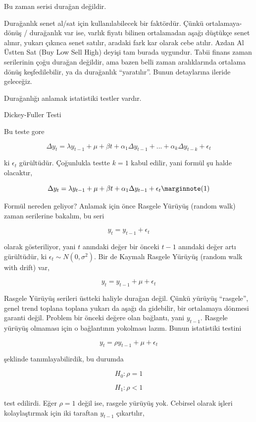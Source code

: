 \documentclass[12pt,fleqn]{article}\usepackage{../../common}
\begin{document}
Bu zaman serisi durağan değildir. 

Durağanlık senet al/sat için kullanılabilecek bir faktördür. Çünkü
ortalamaya-dönüş / durağanlık var ise, varlık fiyatı bilinen ortalamadan
aşağı düştükçe senet alınır, yukarı çıkınca senet satılır, aradaki fark kar
olarak cebe atılır. Azdan Al Üstten Sat (Buy Low Sell High) deyişi tam
burada uygundur. Tabii finans zaman serilerinin çoğu durağan değildir, ama
bazen belli zaman aralıklarında ortalama dönüş keşfedilebilir, ya da
durağanlık ``yaratılır''. Bunun detaylarına ileride geleceğiz. 

Durağanlığı anlamak istatistiki testler vardır.

Dickey-Fuller Testi

Bu teste gore 

$$ \Delta y_t = \lambda y_{t-1} + \mu + \beta t + 
\alpha_1 \Delta y_{t-1} + ... + 
\alpha_k \Delta y_{t-k} + \epsilon_t
$$

ki $\epsilon_t$ gürültüdür. Çoğunlukla testte $k=1$ kabul edilir, yani
formül şu halde olacaktır,

$$ \Delta y_t = \lambda y_{t-1} + 
\mu + \beta t +  
\alpha_1 \Delta y_{t-1} + 
\epsilon_t 
\mlabel{1}
$$

Formül nereden geliyor? Anlamak için önce Rasgele Yürüyüş (random walk) zaman
serilerine bakalım, bu seri

$$ y_t = y_{t-1} + \epsilon_t $$

olarak gösteriliyor, yani $t$ anındaki değer bir önceki $t-1$ anındaki değer
artı gürültüdür, ki $\epsilon_t \sim N(0,\sigma^2)$. Bir de Kaymalı Rasgele
Yürüyüş (random walk with drift) var,

$$ y_t = y_{t-1} + \mu + \epsilon_t $$

Rasgele Yürüyüş serileri üstteki haliyle durağan değil. Çünkü yürüyüş
``rasgele'', genel trend toplana toplana yukarı da aşağı da gidebilir, bir
ortalamaya dönmesi garanti değil. Problem bir önceki değere olan bağlantı,
yani $y_{t-1}$. Rasgele yürüyüş olmaması için o bağlantının yokolması
lazım. Bunun istatistiki testini

$$ y_t = \rho y_{t-1} + \mu + \epsilon_t $$

şeklinde tanımlayabilirdik, bu durumda

$$ H_0: \rho = 1 $$

$$ H_1: \rho < 1 $$

test edilirdi. Eğer $\rho=1$ değil ise, rasgele yürüyüş yok. Cebirsel olarak
işleri kolaylaştırmak için iki taraftan $y_{t-1}$ çıkartılır,
\end{document}
